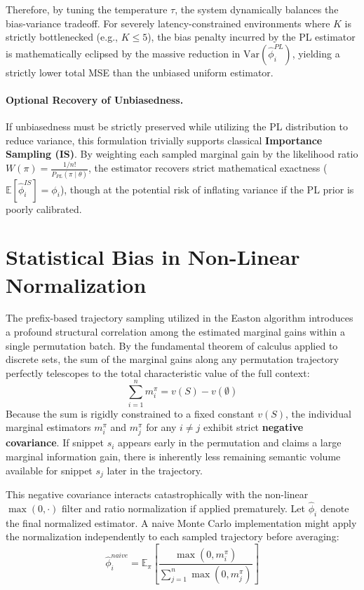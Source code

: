 \documentclass{article}
\begin{document}
Therefore, by tuning the temperature $\tau$, the system dynamically balances the bias-variance tradeoff. For severely latency-constrained environments where $K$ is strictly bottlenecked (e.g., $K \le 5$), the bias penalty incurred by the PL estimator is mathematically eclipsed by the massive reduction in $\text{Var}(\hat{\phi}_i^{PL})$, yielding a strictly lower total MSE than the unbiased uniform estimator.

\paragraph{Optional Recovery of Unbiasedness.} 
If unbiasedness must be strictly preserved while utilizing the PL distribution to reduce variance, this formulation trivially supports classical \textbf{Importance Sampling (IS)}. By weighting each sampled marginal gain by the likelihood ratio $W(\pi) = \frac{1/n!}{P_{PL}(\pi \mid \theta)}$, the estimator recovers strict mathematical exactness ($\mathbb{E}[\hat{\phi}_i^{IS}] = \phi_i$), though at the potential risk of inflating variance if the PL prior is poorly calibrated.





\section{Statistical Bias in Non-Linear Normalization}

The prefix-based trajectory sampling utilized in the Easton algorithm introduces a profound structural correlation among the estimated marginal gains within a single permutation batch. By the fundamental theorem of calculus applied to discrete sets, the sum of the marginal gains along any permutation trajectory perfectly telescopes to the total characteristic value of the full context:
$$ \sum_{i=1}^n m_i^\pi = v(S) - v(\emptyset) $$
Because the sum is rigidly constrained to a fixed constant $v(S)$, the individual marginal estimators $m_i^\pi$ and $m_j^\pi$ for any $i \neq j$ exhibit strict \textbf{negative covariance}. If snippet $s_i$ appears early in the permutation and claims a large marginal information gain, there is inherently less remaining semantic volume available for snippet $s_j$ later in the trajectory. 

This negative covariance interacts catastrophically with the non-linear $\max(0, \cdot)$ filter and ratio normalization if applied prematurely. Let $\hat{\phi}_i$ denote the final normalized estimator. A naive Monte Carlo implementation might apply the normalization independently to each sampled trajectory before averaging:
$$ \hat{\phi}_i^{naive} = \mathbb{E}_{\pi} \left[ \frac{\max(0, m_i^\pi)}{\sum_{j=1}^n \max(0, m_j^\pi)} \right] $$
\end{document}
